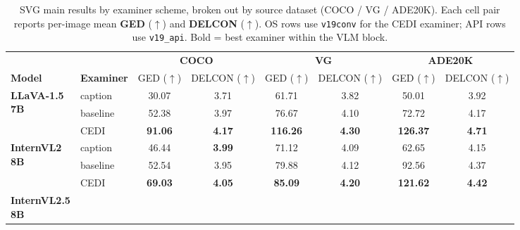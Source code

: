 
\begin{table}[t]
\centering
\tiny
\caption{SVG main results by examiner scheme, broken out by source dataset (COCO / VG / ADE20K). Each cell pair reports per-image mean \textbf{GED} ($\uparrow$) and \textbf{DELCON} ($\uparrow$). OS rows use \texttt{v19conv} for the CEDI examiner; API rows use \texttt{v19\_api}. Bold = best examiner within the VLM block.}
\label{tab:hallucination_stats}
\begin{tabular}{@{}l|l|cc|cc|cc@{}}
\toprule
& & \multicolumn{2}{c|}{\textbf{COCO}} & \multicolumn{2}{c|}{\textbf{VG}} & \multicolumn{2}{c}{\textbf{ADE20K}} \\
\textbf{Model} & \textbf{Examiner} & GED ($\uparrow$) & DELCON ($\uparrow$) & GED ($\uparrow$) & DELCON ($\uparrow$) & GED ($\uparrow$) & DELCON ($\uparrow$) \\
\midrule
\multirow{3}{*}{\parbox{2.5cm}{\centering\textbf{LLaVA-1.5}\\ \textbf{7B}}}
  & caption  & 30.07 & 3.71 & 61.71 & 3.82 & 50.01 & 3.92 \\
  & baseline & 52.38 & 3.97 & 76.67 & 4.10 & 72.72 & 4.17 \\
\rowcolor[HTML]{E6F2FF}
  \multicolumn{1}{l}{\cellcolor{white}} & CEDI & \textbf{91.06} & \textbf{4.17} & \textbf{116.26} & \textbf{4.30} & \textbf{126.37} & \textbf{4.71} \\
\midrule
\multirow{3}{*}{\parbox{2.5cm}{\centering\textbf{InternVL2}\\ \textbf{8B}}}
  & caption  & 46.44 & \textbf{3.99} & 71.12 & 4.09 & 62.65 & 4.15 \\
  & baseline & 52.54 & 3.95 & 79.88 & 4.12 & 92.56 & 4.37 \\
\rowcolor[HTML]{E6F2FF}
  \multicolumn{1}{l}{\cellcolor{white}} & CEDI & \textbf{69.03} & \textbf{4.05} & \textbf{85.09} & \textbf{4.20} & \textbf{121.62} & \textbf{4.42} \\
\midrule
\multirow{3}{*}{\parbox{2.5cm}{\centering\textbf{InternVL2.5}\\ \textbf{8B}}}

\end{tabular}
\end{table}
